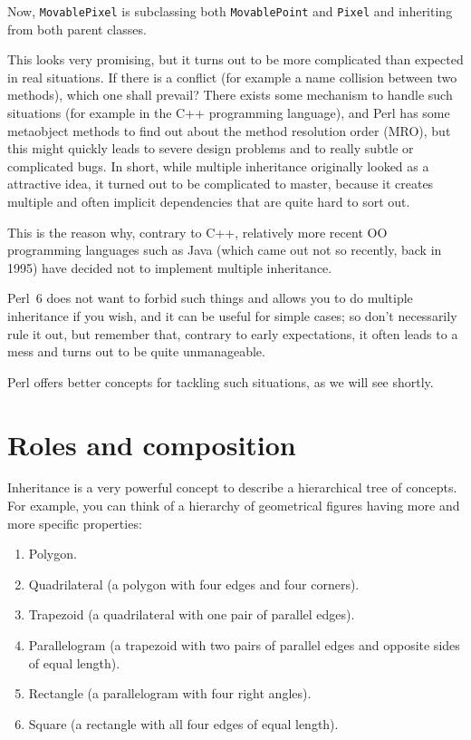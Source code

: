 Now, {\tt MovablePixel} is subclassing both 
{\tt MovablePoint} and {\tt Pixel} and inheriting 
from both parent classes.

This looks very promising, but it turns out to be more 
complicated than expected in real situations. If there is a 
conflict (for example a name collision between two methods), 
which one shall prevail? There exists some mechanism to 
handle such situations (for example in the C++ programming 
language), and Perl has some metaobject methods to find out 
about the method resolution order (MRO), but this 
might quickly leads to severe design 
problems and to really subtle or complicated bugs. In 
short, while multiple inheritance originally looked as a 
attractive idea, it turned out to be complicated to master, 
because it creates multiple and often implicit dependencies 
that are quite hard to sort out.

This is the reason why, contrary to C++, relatively more recent 
OO programming languages such as Java (which came out not 
so recently, back in 1995) have decided not to implement 
multiple inheritance.

Perl~6 does not want to forbid such things and allows you 
to do multiple inheritance if you wish, and it can be useful 
for simple cases; so don't necessarily rule it out, but 
remember that, contrary to early expectations, it often 
leads to a mess and turns out to be quite unmanageable.

Perl offers better concepts for tackling such situations,
as we will see shortly.

\section{Roles and composition}

Inheritance is a very powerful concept to describe a hierarchical 
tree of concepts. For example, you can think of a hierarchy of 
geometrical figures having more and more specific properties: 
\begin{enumerate}
\item Polygon.

\item Quadrilateral (a polygon with four edges and four corners).

\item Trapezoid (a quadrilateral with one pair of parallel edges).

\item Parallelogram (a trapezoid with two pairs of parallel 
edges and opposite sides of equal length).

\item Rectangle (a parallelogram with four right angles).

\item Square (a rectangle with all four edges of equal length).
\end{enumerate}

